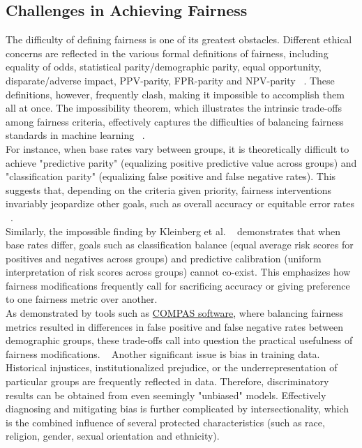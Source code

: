 \documentclass[runningheads]{llncs}
\begin{document}
\subsection{Challenges in Achieving Fairness}
The difficulty of defining fairness is one of its greatest obstacles. Different ethical concerns are reflected in the various formal definitions of fairness\cite{precioso2024ethical}, including equality of odds, statistical parity/demographic parity, equal opportunity, disparate/adverse impact, PPV-parity, FPR-parity and NPV-parity ~\cite{fraenkel2020fairness}. These definitions, however, frequently clash, making it impossible to accomplish them all at once. The impossibility theorem, which illustrates the intrinsic trade-offs among fairness criteria, effectively captures the difficulties of balancing fairness standards in machine learning ~\cite{bell2023fairness}.\\

For instance, when base rates vary between groups, it is theoretically difficult to achieve "predictive parity" (equalizing positive predictive value across groups) and "classification parity" (equalizing false positive and false negative rates). This suggests that, depending on the criteria given priority, fairness interventions invariably jeopardize other goals, such as overall accuracy or equitable error rates  ~\cite{dibello2021fairness,nguyen2022fairness}.\\

Similarly, the impossible finding by Kleinberg et al. ~\cite{kleinberg2016} demonstrates that when base rates differ, goals such as classification balance (equal average risk scores for positives and negatives across groups) and predictive calibration (uniform interpretation of risk scores across groups) cannot co-exist. This emphasizes how fairness modifications frequently call for sacrificing accuracy or giving preference to one fairness metric over another.\\

As demonstrated by tools such as \href{https://en.wikipedia.org/wiki/COMPAS_(software)}{COMPAS software}, where balancing fairness metrics resulted in differences in false positive and false negative rates between demographic groups, these trade-offs call into question the practical usefulness of fairness modifications. ~\cite{yap2024} Another significant issue is bias in training data. Historical injustices, institutionalized prejudice, or the underrepresentation of particular groups are frequently reflected in data. Therefore, discriminatory results can be obtained from even seemingly "unbiased" models. Effectively diagnosing and mitigating bias is further complicated by intersectionality, which is the combined influence of several protected characteristics (such as race, religion, gender, sexual orientation and ethnicity).\\
\end{document}
